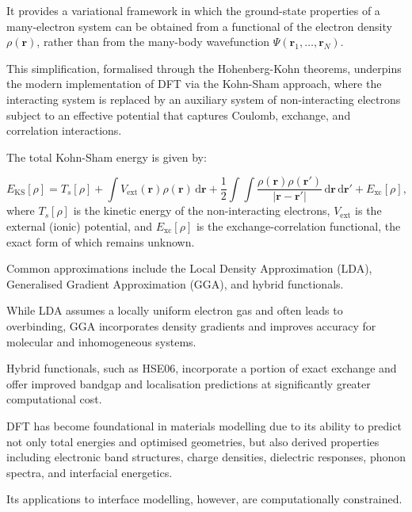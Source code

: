 It provides a variational framework in which the ground-state properties of a many-electron system can be obtained from
a functional of the electron density $\rho(\mathbf{r})$, rather than from the many-body wavefunction
$\Psi(\mathbf{r}_1, \dots, \mathbf{r}_N)$.

This simplification, formalised through the Hohenberg-Kohn theorems, underpins the modern implementation of DFT via the
Kohn-Sham approach, where the interacting system is replaced by an auxiliary system of non-interacting electrons subject
to an effective potential that captures Coulomb, exchange, and correlation interactions.


The total Kohn-Sham energy is given by:

\begin{equation} E_{\mathrm{KS}}[\rho] = T_s[\rho] + \int V_{\mathrm{ext}}(\mathbf{r}) \rho(\mathbf{r}) \, \mathrm{d}\mathbf{r} + \frac{1}{2} \int \int \frac{\rho(\mathbf{r}) \rho(\mathbf{r'})}{|\mathbf{r} - \mathbf{r'}|} \, \mathrm{d}\mathbf{r} \, \mathrm{d}\mathbf{r'} + E_{\mathrm{xc}}[\rho], \end{equation} where $T_s[\rho]$ is the kinetic energy of the non-interacting electrons, $V_{\mathrm{ext}}$ is the external (ionic) potential, and $E_{\mathrm{xc}}[\rho]$ is the exchange-correlation functional, the exact form of which remains unknown.


Common approximations include the Local Density Approximation (LDA), Generalised Gradient Approximation (GGA), and
hybrid functionals.

While LDA assumes a locally uniform electron gas and often leads to overbinding, GGA incorporates density gradients and
improves accuracy for molecular and inhomogeneous systems.

Hybrid functionals, such as HSE06, incorporate a portion of exact exchange and offer improved bandgap and localisation
predictions at significantly greater computational cost.


DFT has become foundational in materials modelling due to its ability to predict not only total energies and optimised
geometries, but also derived properties including electronic band structures, charge densities, dielectric responses,
phonon spectra, and interfacial energetics.

Its applications to interface modelling, however, are computationally constrained.


